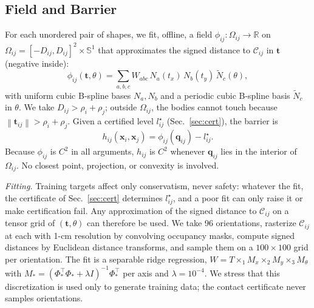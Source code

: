 \documentclass[journal]{IEEEtran}
\theoremstyle{definition}
\newcommand{\R}{\mathbb{R}}
\newcommand{\Sone}{\mathbb{S}^1}
\newcommand{\norm}[1]{\left\lVert #1\right\rVert}
\newcommand{\CO}{\mathcal{C}}
\begin{document}
\subsection{Field and Barrier}
For each unordered pair of shapes, we fit, offline, a field $\phi_{ij}:\Omega_{ij}\to\R$ on
$\Omega_{ij}=[-D_{ij},D_{ij}]^2\times\Sone$ that approximates the signed distance to $\CO_{ij}$ in
$\mathbf t$ (negative inside):
\begin{equation}\label{eq:field}
\phi_{ij}(\mathbf t,\theta)=\sum_{a,b,c}W_{abc}\,N_a(t_x)\,N_b(t_y)\,\tilde N_c(\theta),
\end{equation}
with uniform cubic B-spline bases $N_a,N_b$ and a periodic cubic B-spline basis $\tilde N_c$ in
$\theta$. We take $D_{ij}>\rho_i+\rho_j$; outside $\Omega_{ij}$, the bodies cannot touch because
$\norm{\mathbf t_{ij}}>\rho_i+\rho_j$. Given a certified level $l^\star_{ij}$ (Sec.~\ref{sec:cert}),
the barrier is
\begin{equation}\label{eq:h}
h_{ij}(\mathbf x_i,\mathbf x_j)=\phi_{ij}(\mathbf q_{ij})-l^\star_{ij}.
\end{equation}
Because $\phi_{ij}$ is $C^2$ in all arguments, $h_{ij}$ is $C^2$ whenever $\mathbf q_{ij}$ lies in
the interior of $\Omega_{ij}$. No closest point, projection, or convexity is involved.

\emph{Fitting.} Training targets affect only conservatism, never safety: whatever the fit, the
certificate of Sec.~\ref{sec:cert} determines $l^\star_{ij}$, and a poor fit can only raise it or
make certification fail. Any approximation of the signed distance to $\CO_{ij}$ on a tensor grid of
$(\mathbf t,\theta)$ can therefore be used. We take 96 orientations, rasterize $\CO_{ij}$ at each
with 1-cm resolution by convolving occupancy masks, compute signed distances by Euclidean distance
transforms, and sample them on a $100\times100$ grid per orientation. The fit is a separable ridge
regression, $W=T\times_1M_x\times_2M_y\times_3M_\theta$ with
$M_\ast=(\Phi_\ast^\top\Phi_\ast+\lambda I)^{-1}\Phi_\ast^\top$ per axis and $\lambda=10^{-4}$. We
stress that this discretization is used only to generate training data; the contact certificate
never samples orientations.
\end{document}
